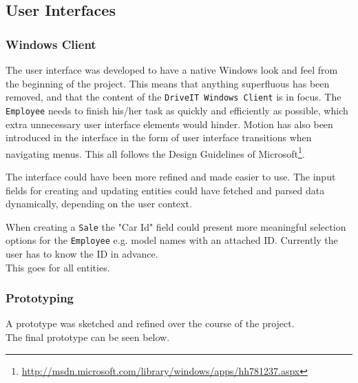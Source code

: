 \subsection{User Interfaces}

\subsubsection{Windows Client}
The user interface was developed to have a native Windows look and feel from the beginning of the project. 
This means that anything superfluous has been removed, and that the content of the \texttt{DriveIT Windows Client} is in focus. 
The \texttt{Employee} needs to finish his/her task as quickly and efficiently as possible, which extra unnecessary user interface elements would hinder.
Motion has also been introduced in the interface in the form of user interface transitions when navigating menus. 
This all follows the Design Guidelines of Microsoft\footnote{\url{http://msdn.microsoft.com/library/windows/apps/hh781237.aspx}}.

The interface could have been more refined and made easier to use. The input fields for creating and updating entities could have fetched and parsed data dynamically, depending on the user context. 

When creating a \texttt{Sale} the "Car Id" field could present more meaningful selection options for the \texttt{Employee} e.g. model names with an attached ID. Currently the user has to know the ID in advance. \\
This goes for all entities.

\subsubsection{Prototyping}
A prototype was sketched and refined over the course of the project.\\
The final prototype can be seen below.\\


